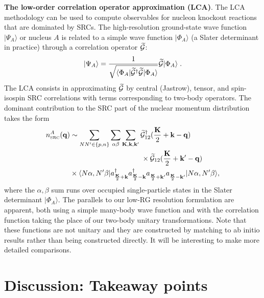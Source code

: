 \documentclass[10pt,aps,prc,floatfix,twocolumn,nofootinbib]{revtex4-1}
\begin{document}
\textbf{The low-order correlation operator approximation (LCA)}.
The LCA methodology can be used to compute observables for nucleon knockout reactions that are dominated by SRCs.
The high-resolution ground-state wave function $|\Psi_A\rangle$ or nucleus $A$  is related to a simple wave function $|\Phi_A\rangle$ (a Slater determinant in practice) through a correlation operator
$\widetilde{\mathcal{G}}$:
%
\begin{align}
    |\Psi_A\rangle = \frac{1}{\sqrt{\langle \Phi_A | \widetilde{\mathcal{G}}^\dagger \widetilde{\mathcal{G}} | \Phi_A\rangle}}
    \widetilde{\mathcal{G}} | \Phi_A \rangle
    \;.
\end{align}
%
The LCA consists in approximating $\widetilde{\mathcal{G}}$ by central (Jastrow), tensor, and spin-isospin SRC correlations with terms corresponding to two-body operators.
The dominant contribution to the SRC part of the nuclear momentum distribution takes the form~\cite{Ryckebusch:2019oya}
%
\begin{align} \label{eq:LCA}
    n^A_{\rm\scriptscriptstyle SRC}(\qvec) &\sim 
    \sum_{NN'\in\{p,n\}} \sum_{\alpha\beta} \sum_{\Kvec,\kvec,\kvec'}
    \calG^\dagger_{12}(\frac{\Kvec}{2}+\kvec-\qvec) \notag \\
    & \qquad\qquad\qquad\qquad\qquad \null \times
    \calG_{12}(\frac{\Kvec}{2}+\kvec'-\qvec) \notag \\
    & \null \times \langle N\alpha, N'\beta |
    \akdag_{\frac{\Kvec}{2}+\kvec}
    \akdag_{\frac{\Kvec}{2}-\kvec}
    a^{\phantom{\dagger}}_{\frac{\Kvec}{2}+\kvec'}
    a^{\phantom{\dagger}}_{\frac{\Kvec}{2}-\kvec'}
    | N\alpha, N'\beta \rangle
    ,
\end{align}
%
where the $\alpha,\beta$ sum runs over  occupied single-particle states
in the Slater determinant $|\Phi_A\rangle$.
The parallels to our low-RG resolution formulation are apparent, both using a simple many-body wave function and with the correlation function taking the place of our two-body unitary transformations.
Note that these functions 
are not unitary and they are constructed by matching to ab initio results rather than being constructed directly.
It will be interesting to make more detailed comparisons.

\section{Discussion: Takeaway points} \label{sec:implications}
\end{document}
